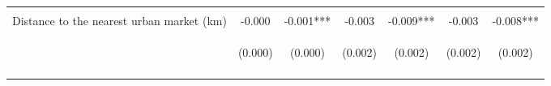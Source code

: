 \begin{center}
\begin{tabular}{lcccccc}
\vspace{4pt} & \begin{footnotesize}[0.003]\end{footnotesize} & \begin{footnotesize}[0.004]\end{footnotesize} & \begin{footnotesize}[0.418]\end{footnotesize} & \begin{footnotesize}[0.470]\end{footnotesize} & \begin{footnotesize}[0.529]\end{footnotesize} & \begin{footnotesize}[0.587]\end{footnotesize} \\
Distance to the nearest urban market (km) & -0.000 & -0.001*** & -0.003 & -0.009*** & -0.003 & -0.008*** \\
 & \begin{footnotesize}(0.000)\end{footnotesize} & \begin{footnotesize}(0.000)\end{footnotesize} & \begin{footnotesize}(0.002)\end{footnotesize} & \begin{footnotesize}(0.002)\end{footnotesize} & \begin{footnotesize}(0.002)\end{footnotesize} & \begin{footnotesize}(0.002)\end{footnotesize} \\
\vspace{4pt} & \begin{footnotesize}[0.182]\end{footnotesize} & \begin{footnotesize}[0.000]\end{footnotesize} & \begin{footnotesize}[0.131]\end{footnotesize} & \begin{footnotesize}[0.000]\end{footnotesize} & \begin{footnotesize}[0.131]\end{footnotesize} & \begin{footnotesize}[0.000]\end{footnotesize} \\

\end{tabular}
\end{center}

